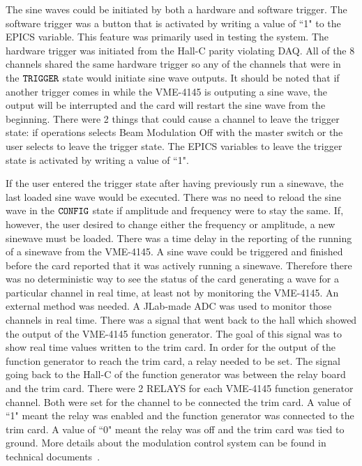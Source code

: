 The sine waves could be initiated by both a hardware and software trigger. The software trigger was a button that is activated by writing a value of ``1" to the EPICS variable. This feature was primarily used in testing the system. The hardware trigger was initiated from the Hall-C parity violating DAQ. All of the 8 channels shared the same hardware trigger so any of the channels that were in the ${\tt TRIGGER}$ state would initiate sine wave outputs. It should be noted that if another trigger comes in while the VME-4145 is outputing a sine wave, the output will be interrupted and the card will restart the sine wave from the beginning. There were 2 things that could cause a channel to leave the trigger state: if operations selects Beam Modulation Off with the master switch or the user selects to leave the trigger state. The EPICS variables to leave the trigger state is activated by writing a value of ``1". 

If the user entered the trigger state after having previously run a sinewave, the last loaded sine wave would be executed. There was no need to reload the sine wave in the ${\tt CONFIG}$ state if amplitude and frequency were to stay the same. If, however, the user desired to change either the frequency or amplitude, a new sinewave must be loaded. There was a time delay in the reporting of the running of a sinewave from the VME-4145. A sine wave could be triggered and finished before the card reported that it was actively running a sinewave. Therefore there was no deterministic way to see the status of the card generating a wave for a particular channel in real time, at least not by monitoring the VME-4145. An external method was needed. A JLab-made ADC was used to monitor those channels in real time. There was a signal that went back to the hall which showed the output of the VME-4145 function generator. The goal of this signal was to show real time values written to the trim card. In order for the output of the function generator to reach the trim card, a relay needed to be set. The signal going back to the Hall-C of the function generator was between the relay board and the trim card. There were 2 RELAYS for each VME-4145 function generator channel. Both were set for the channel to be connected the trim card. A value of ``1" meant the relay was enabled and the function generator was connected to the trim card. A value of ``0" meant the relay was off and the trim card was tied to ground. More details about the modulation control system can be found in technical documents~\cite{nur_bm_controls, nur_bm_GUI_proposal}.



